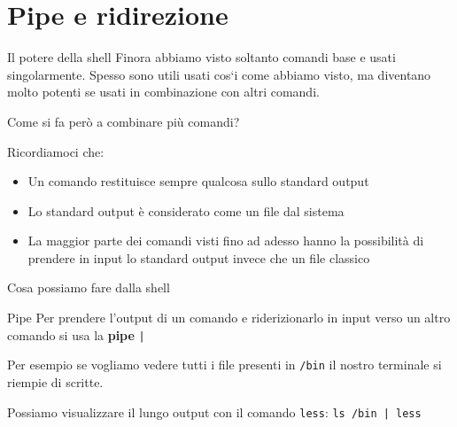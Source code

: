 \section{Pipe e ridirezione}
\begin{frame}{Il potere della shell}
  Finora abbiamo visto soltanto comandi base e usati singolarmente. Spesso sono
  utili usati cos`i come abbiamo visto, ma diventano molto potenti se usati in
  combinazione con altri comandi.\bigskip

  Come si fa però a combinare più comandi? \bigskip 

  Ricordiamoci che:
  \begin{itemize}
    \item Un comando restituisce sempre qualcosa sullo standard output
    \item Lo standard output è considerato come un file dal sistema
    \item La maggior parte dei comandi visti fino ad adesso hanno la 
      possibilità di prendere in input lo standard output invece che un file 
      classico
  \end{itemize}
\end{frame}

\begin{frame}{Cosa possiamo fare dalla shell}
  \begin{figure}
  \end{figure}
\end{frame}

\begin{frame}{Pipe}
  Per prendere l'output di un comando e riderizionarlo in input verso un altro
  comando si usa la \textbf{pipe} \texttt{|}\bigskip

  Per esempio se vogliamo vedere tutti i file presenti in \texttt{/bin} il 
  nostro terminale si riempie di scritte.\bigskip

  Possiamo visualizzare il lungo output con il comando \texttt{less}: 
  \texttt{ls /bin | less}
\end{frame}

